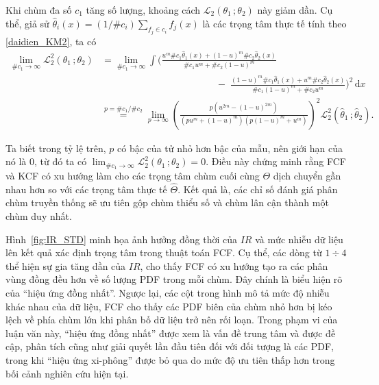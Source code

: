 \documentclass[a4paper,oneside]{book} %
\theoremstyle{plain}
\theoremstyle{plain}
\theoremstyle{nonumberplain}
\begin{document}
  Khi chùm đa số $c_1$ tăng số lượng, khoảng cách $\mathcal{L}_2(\theta_1\,;\theta_2)$ này giảm dần. Cụ thể, giả sử $\widehat\theta_i(x)=(1/\#c_i)\sum_{f_j\in c_i} f_j(x)$ là các trọng tâm thực tế tính theo \eqref{daidien_KM2}, ta có
\begin{align*}
	\lim_{\#c_1 \to \infty} \mathcal{L}^2_2(\theta_1\,;\theta_2)
	&= \lim_{\#c_1 \to \infty}
	\int\Bigg(
	\frac{u^m  \#c_1\widehat\theta_1(x) + (1-u)^m \#c_2\widehat\theta_2(x)}
	{\#c_1u^m + \#c_2(1-u)^m}
	\\
	&\hspace{5cm}
	-\;
	\frac{(1-u)^m \#c_1\widehat\theta_1(x) + u^m \#c_2\widehat\theta_2(x)}
	{\#c_1(1-u)^m + \#c_2u^m}
	\Bigg)^{2}\mathrm{\,d}x
	\\[6pt]
	&\stackrel{p=\#c_1/\#c_2}{=}
	\lim_{p \to \infty}
	\left(
	\frac{p(u^{2m} - (1-u)^{2m})}
	{(p u^m + (1-u)^m)(p(1-u)^m + u^m)}
	\right)^{2}
	\mathcal{L}^2_2(\widehat{\theta}_1\,;\widehat{\theta}_2).
\end{align*}

  
  Ta biết trong tỷ lệ trên, $p$ có bậc của tử nhỏ hơn bậc của mẫu, nên giới hạn của nó là $0$, từ đó ta có
  $ \lim_{\#c_1 \to \infty} \mathcal{L}^2_2(\theta_1\,;\theta_2) = 0 $. Điều này chứng minh rằng FCF và KCF có xu hướng làm cho các trọng tâm chùm cuối cùng $\Theta$ dịch chuyển gần nhau hơn so với các trọng tâm thực tế $\widehat{\Theta}$. Kết quả là, các chỉ số đánh giá phân chùm truyền thống sẽ ưu tiên gộp chùm thiểu số và chùm lân cận thành một chùm duy nhất.

Hình~\ref{fig:IR_STD} minh họa ảnh hưởng đồng thời của $IR$ và mức nhiễu dữ liệu lên kết quả xác định trọng tâm trong thuật toán FCF. Cụ thể, các dòng từ $1\div4$ thể hiện sự gia tăng dần của $IR$, cho thấy FCF có xu hướng tạo ra các phân vùng đồng đều hơn về số lượng PDF trong mỗi chùm. Đây chính là biểu hiện rõ của ``hiệu ứng đồng nhất''. 
Ngược lại, các cột trong hình mô tả mức độ nhiễu khác nhau của dữ liệu, FCF cho thấy các PDF biên của chùm nhỏ hơn bị kéo lệch về phía chùm lớn khi phân bố dữ liệu trở nên rối loạn.
Trong phạm vi của luận văn này, “hiệu ứng đồng nhất” được xem là vấn đề trung tâm và được đề cập, phân tích cũng như giải quyết lần đầu tiên đối với đối tượng là các PDF, trong khi “hiệu ứng xi-phông” được bỏ qua do mức độ ưu tiên thấp hơn trong bối cảnh nghiên cứu hiện tại.
\end{document}
